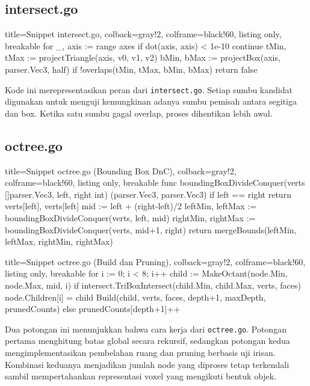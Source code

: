 \subsection{intersect.go}
\begin{tcblisting}{
        title={Snippet intersect.go},
        colback=gray!2,
        colframe=black!60,
        listing only,
        breakable
    }
    for _, axis := range axes {
    if dot(axis, axis) < 1e-10 {
    continue
    }
    tMin, tMax := projectTriangle(axis, v0, v1, v2)
    bMin, bMax := projectBox(axis, parser.Vec3{}, half)
    if !overlaps(tMin, tMax, bMin, bMax) {
            return false
        }
    }
\end{tcblisting}

Kode ini merepresentasikan peran dari \texttt{intersect.go}. Setiap sumbu kandidat digunakan untuk menguji kemungkinan adanya sumbu pemisah antara segitiga dan box. Ketika satu sumbu gagal overlap, proses dihentikan lebih awal.

\subsection{octree.go}
\begin{tcblisting}{
        title={Snippet octree.go (Bounding Box DnC)},
        colback=gray!2,
        colframe=black!60,
        listing only,
        breakable
    }
    func boundingBoxDivideConquer(verts []parser.Vec3, left, right int) (parser.Vec3, parser.Vec3) {
            if left == right {
                    return verts[left], verts[left]
                }
            mid := left + (right-left)/2
            leftMin, leftMax := boundingBoxDivideConquer(verts, left, mid)
            rightMin, rightMax := boundingBoxDivideConquer(verts, mid+1, right)
            return mergeBounds(leftMin, leftMax, rightMin, rightMax)
        }
\end{tcblisting}

\begin{tcblisting}{
        title={Snippet octree.go (Build dan Pruning)},
        colback=gray!2,
        colframe=black!60,
        listing only,
        breakable
    }
    for i := 0; i < 8; i++ {
    child := MakeOctant(node.Min, node.Max, mid, i)
    if intersect.TriBoxIntersect(child.Min, child.Max, verts, faces) {
            node.Children[i] = child
            Build(child, verts, faces, depth+1, maxDepth, prunedCounts)
        } else {
            prunedCounts[depth+1]++
        }
    }
\end{tcblisting}

Dua potongan ini menunjukkan bahwa cara kerja dari \texttt{octree.go}. Potongan pertama menghitung batas global secara rekursif, sedangkan potongan kedua mengimplementasikan pembelahan ruang dan pruning berbasis uji irisan. Kombinasi keduanya menjadikan jumlah node yang diproses tetap terkendali sambil mempertahankan representasi voxel yang mengikuti bentuk objek.
